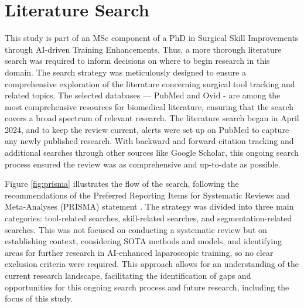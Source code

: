 \section{Literature Search}

This study is part of an MSc component of a PhD in Surgical Skill Improvements through AI-driven Training Enhancements. Thus, a more thorough literature search was required to inform decisions on where to begin research in this domain. The search strategy was meticulously designed to ensure a comprehensive exploration of the literature concerning surgical tool tracking and related topics. The selected databases — PubMed and Ovid - are among the most comprehensive resources for biomedical literature, ensuring that the search covers a broad spectrum of relevant research. The literature search began in April 2024, and to keep the review current, alerts were set up on PubMed to capture any newly published research. With backward and forward citation tracking and additional searches through other sources like Google Scholar, this ongoing search process ensured the review was as comprehensive and up-to-date as possible.

Figure \ref{fig:prisma} illustrates the flow of the search, following the recommendations of the Preferred Reporting Items for Systematic Reviews and Meta-Analyses (PRISMA) statement \cite{moher_preferred_2010}. The strategy was divided into three main categories: tool-related searches, skill-related searches, and segmentation-related searches. This was not focused on conducting a systematic review but on establishing context, considering SOTA methods and models, and identifying areas for further research in AI-enhanced laparoscopic training, so no clear exclusion criteria were required. This approach allows for an understanding of the current research landscape, facilitating the identification of gaps and opportunities for this ongoing search process and future research, including the focus of this study.

